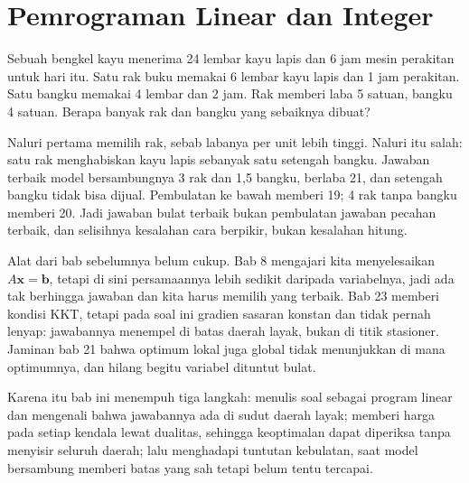\chapter{Pemrograman Linear dan Integer}

Sebuah bengkel kayu menerima 24 lembar kayu lapis dan 6 jam mesin perakitan untuk hari
itu. Satu rak buku memakai 6 lembar kayu lapis dan 1 jam perakitan. Satu bangku memakai
4 lembar dan 2 jam. Rak memberi laba 5 satuan, bangku 4 satuan. Berapa banyak rak dan
bangku yang sebaiknya dibuat?

Naluri pertama memilih rak, sebab labanya per unit lebih tinggi. Naluri itu salah: satu rak
menghabiskan kayu lapis sebanyak satu setengah bangku. Jawaban terbaik model bersambungnya
3 rak dan 1,5 bangku, berlaba 21, dan setengah bangku tidak bisa dijual. Pembulatan ke bawah
memberi 19; 4 rak tanpa bangku memberi 20. Jadi jawaban bulat terbaik bukan pembulatan
jawaban pecahan terbaik, dan selisihnya kesalahan cara berpikir, bukan kesalahan hitung.

Alat dari bab sebelumnya belum cukup. Bab 8 mengajari kita menyelesaikan
$A\mathbf{x}=\mathbf{b}$, tetapi di sini persamaannya lebih sedikit daripada variabelnya,
jadi ada tak berhingga jawaban dan kita harus memilih yang terbaik. Bab 23 memberi kondisi
KKT, tetapi pada soal ini gradien sasaran konstan dan tidak pernah lenyap: jawabannya
menempel di batas daerah layak, bukan di titik stasioner. Jaminan bab 21 bahwa optimum lokal
juga global tidak menunjukkan di mana optimumnya, dan hilang begitu variabel dituntut
bulat.

Karena itu bab ini menempuh tiga langkah: menulis soal sebagai program linear dan
mengenali bahwa jawabannya ada di sudut daerah layak; memberi harga pada setiap kendala
lewat dualitas, sehingga keoptimalan dapat diperiksa tanpa menyisir seluruh daerah; lalu
menghadapi tuntutan kebulatan, saat model bersambung memberi batas yang sah tetapi belum
tentu tercapai.

